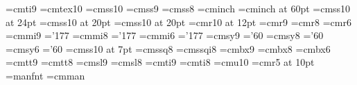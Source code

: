 %
%
%
%
\font{}=cmti9
\def\defnannotationtext#1{{\defnannotationfont #1}}
\font\tentex=cmtex10
\font\sourcefont=cmss10
\font\holonfont=cmss9
\def\holonnametext#1{{\holonfont #1}}
\hyphenchar{}
\font\usagefont=cmss8
\def\endnotetext#1{{\usagefont #1}}
\def\sectiontoctext#1{{\usagefont #1}}
\font\inchhighfont=cminch
\font\reducedinchhighfont=cminch at 60pt
\font\chaptertitlefont=cmss10 at 24pt
\def\chaptertitletext#1{\chaptertitlefont #1}
\font\sectiontitlefont=cmss10 at 20pt
\def\sectiontitletext#1{\sectiontitlefont #1}
\font\ssectiontitlefont=cmss10 at 20pt
\font\sssectiontitlefont=cmr10 at 12pt
\font\ninerm=cmr9
\font\eightrm=cmr8
\font\sixrm=cmr6
\font\ninei=cmmi9
\skewchar\ninei='177
\font\eighti=cmmi8
\skewchar\eighti='177
\font\sixi=cmmi6
\skewchar\sixi='177
\font\ninesy=cmsy9
\skewchar\ninesy='60
\font\eightsy=cmsy8
\skewchar\eightsy='60
\font\sixsy=cmsy6
\skewchar\sixsy='60
\font\holonnumberfont=cmss10 at 7pt
\def\holonnumbertext#1{{\holonnumberfont #1}}
\font\eightss=cmssq8
\font\eightssi=cmssqi8
\font\ninebf=cmbx9
\font\eightbf=cmbx8
\font\sixbf=cmbx6
\font\ninett=cmtt9
\hyphenchar{}
\font\eighttt=cmtt8
\hyphenchar{}
\hyphenchar{} %
\font\ninesl=cmsl9
\font\eightsl=cmsl8
\font\nineit=cmti9
\font\eightit=cmti8
\font\tenu=cmu10 %
\font\magnifiedfiverm=cmr5 at 10pt
\font\manual=manfnt %
\font\cmman=cmman %
%
%
\newskip\ttglue
\def\tenpoint{\def\rm{\fam0\tenrm}%
  \textfont0=\tenrm \scriptfont0=\sevenrm \scriptscriptfont0=\fiverm
  \textfont1=\teni \scriptfont1=\seveni \scriptscriptfont1=\fivei
  \textfont2=\tensy \scriptfont2=\sevensy \scriptscriptfont2=\fivesy
  \textfont3=\tenex \scriptfont3=\tenex \scriptscriptfont3=\tenex
  \def\it{\fam\itfam\tenit}%
  \textfont\itfam=\tenit
  \def\sl{\fam\slfam\tensl}%
  \textfont\slfam=\tensl
  \def\bf{\fam\bffam\tenbf}%
  \textfont\bffam=\tenbf \scriptfont\bffam=\sevenbf
   \scriptscriptfont\bffam=\fivebf
  \def\tt{\fam\ttfam\tentt}%
  \textfont\ttfam=\tentt
  \tt \ttglue=.5em plus.25em minus.15em
  \normalbaselineskip=12pt
  \def\MF{{\manual META}\-{\manual FONT}}%
  \let\sc=\eightrm
  \let\big=\tenbig
  \setbox\strutbox=\hbox{\vrule height8.5pt depth3.5pt width\z@}%
  \normalbaselines\rm}
